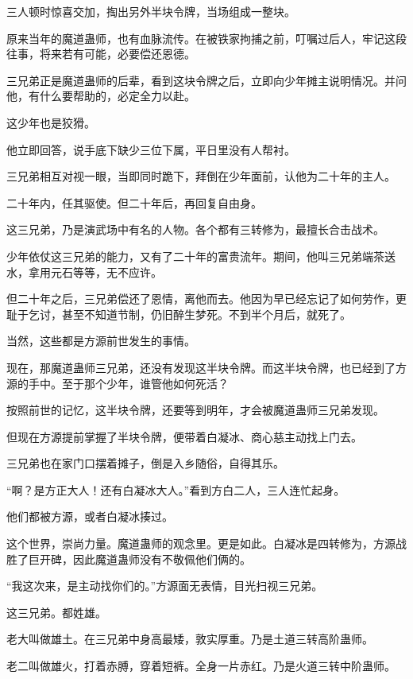 
\begin{this_body}

三人顿时惊喜交加，掏出另外半块令牌，当场组成一整块。

原来当年的魔道蛊师，也有血脉流传。在被铁家拘捕之前，叮嘱过后人，牢记这段往事，将来若有可能，必要偿还恩德。

三兄弟正是魔道蛊师的后辈，看到这块令牌之后，立即向少年摊主说明情况。并问他，有什么要帮助的，必定全力以赴。

这少年也是狡猾。

他立即回答，说手底下缺少三位下属，平日里没有人帮衬。

三兄弟相互对视一眼，当即同时跪下，拜倒在少年面前，认他为二十年的主人。

二十年内，任其驱使。但二十年后，再回复自由身。

这三兄弟，乃是演武场中有名的人物。各个都有三转修为，最擅长合击战术。

少年依仗这三兄弟的能力，又有了二十年的富贵流年。期间，他叫三兄弟端茶送水，拿用元石等等，无不应许。

但二十年之后，三兄弟偿还了恩情，离他而去。他因为早已经忘记了如何劳作，更耻于乞讨，甚至不知道节制，仍旧醉生梦死。不到半个月后，就死了。

当然，这些都是方源前世发生的事情。

现在，那魔道蛊师三兄弟，还没有发现这半块令牌。而这半块令牌，也已经到了方源的手中。至于那个少年，谁管他如何死活？

按照前世的记忆，这半块令牌，还要等到明年，才会被魔道蛊师三兄弟发现。

但现在方源提前掌握了半块令牌，便带着白凝冰、商心慈主动找上门去。

三兄弟也在家门口摆着摊子，倒是入乡随俗，自得其乐。

“啊？是方正大人！还有白凝冰大人。”看到方白二人，三人连忙起身。

他们都被方源，或者白凝冰揍过。

这个世界，崇尚力量。魔道蛊师的观念里。更是如此。白凝冰是四转修为，方源战胜了巨开碑，因此魔道蛊师没有不敬佩他们俩的。

“我这次来，是主动找你们的。”方源面无表情，目光扫视三兄弟。

这三兄弟。都姓雄。

老大叫做雄土。在三兄弟中身高最矮，敦实厚重。乃是土道三转高阶蛊师。

老二叫做雄火，打着赤膊，穿着短裤。全身一片赤红。乃是火道三转中阶蛊师。


\end{this_body}
